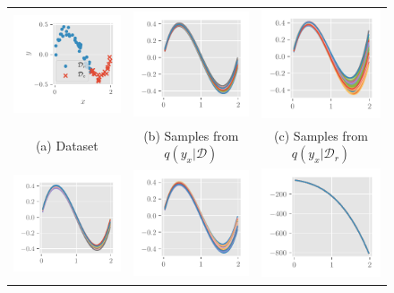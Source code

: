 \documentclass{article}
\theoremstyle{definition}
\newcommand{\mcl}[1]{\mathcal{#1}}
\newcommand{\da}{\mcl{D}}
\newcommand{\dc}{\mcl{D}_r}
\begin{document}
\begin{figure}
\centering
\begin{tabular}{ccc}
\includegraphics[height=0.2\textwidth]{img/linear_regression/lr_data}
&
\includegraphics[height=0.2\textwidth]{img/linear_regression/linear_regression_gauss_diag_full}
&
\includegraphics[height=0.2\textwidth]{img/linear_regression/linear_regression_gauss_diag_remain}
\\
(a) Dataset
&
(b) Samples from $q(y_x| \da)$
&
(c) Samples from $q(y_x| \dc)$
\\
\includegraphics[height=0.2\textwidth]{img/linear_regression/linear_regression_gauss_diag_eubo_0_5}
&
\includegraphics[height=0.2\textwidth]{img/linear_regression/linear_regression_gauss_diag_eubo_0_1}
&
\includegraphics[height=0.2\textwidth]{img/linear_regression/linear_regression_gauss_diag_eubo_0_0}

\end{tabular}
\end{figure}
\end{document}

